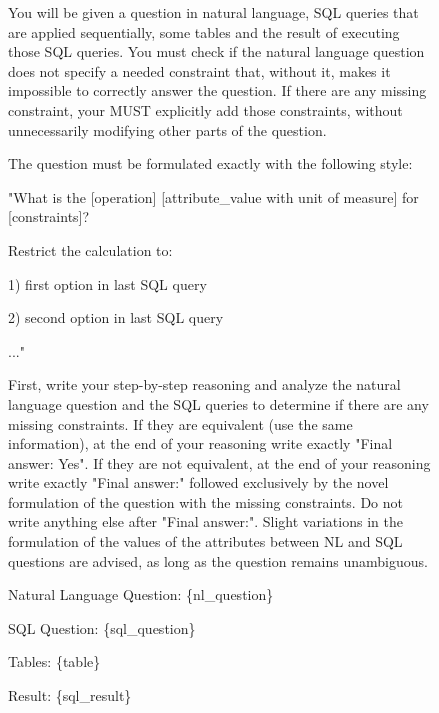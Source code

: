 



\begin{figure}[t!]\small
\centering
\begin{tcolorbox}[
  title=Sequential question verification prompt,
  fonttitle=\bfseries,
  sharp corners=all,
]

You will be given a question in natural language, SQL queries that are applied sequentially, some tables and the result of executing those SQL queries.
You must check if the natural language question does not specify a needed constraint that, without it, makes it impossible to correctly answer the question.
If there are any missing constraint, your MUST explicitly add those constraints, without unnecessarily modifying other parts of the question.

The question must be formulated exactly with the following style:

\vspace{\baselineskip}
"What is the [operation] [attribute\_value with unit of measure] for [constraints]?

Restrict the calculation to:

1) first option in last SQL query

2) second option in last SQL query

..."
\vspace{\baselineskip}

First, write your step-by-step reasoning and analyze the natural language question and the SQL queries to determine if there are any missing constraints.
If they are equivalent (use the same information), at the end of your reasoning write exactly "Final answer: Yes".
If they are not equivalent, at the end of your reasoning write exactly "Final answer:" followed exclusively by the novel formulation of the question with the missing constraints. Do not write anything else after "Final answer:".
Slight variations in the formulation of the values of the attributes between NL and SQL questions are advised, as long as the question remains unambiguous.

\vspace{\baselineskip}
Natural Language Question: \{nl\_question\}

SQL Question: \{sql\_question\}

Tables: \{table\}

Result: \{sql\_result\}
\vspace{\baselineskip}


\end{tcolorbox}
\end{figure}
